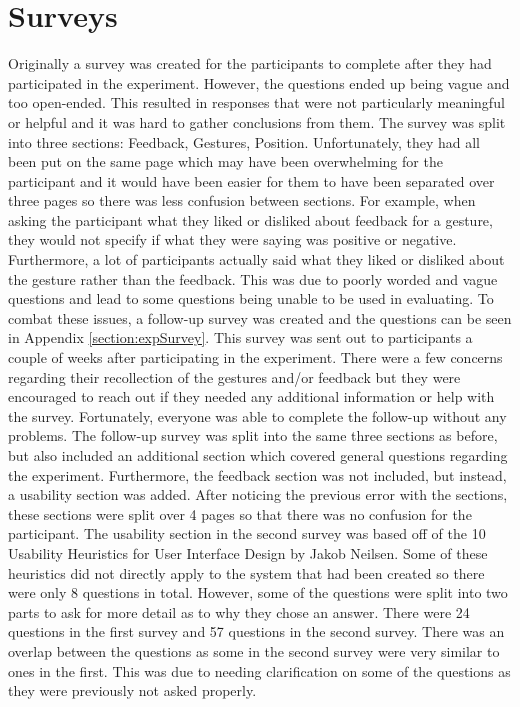 \documentclass{l4proj}
\begin{document}
\section{Surveys}
Originally a survey was created for the participants to complete after they had participated in the experiment. However, the questions ended up being vague and too open-ended. This resulted in responses that were not particularly meaningful or helpful and it was hard to gather conclusions from them. 
The survey was split into three sections: Feedback, Gestures, Position. Unfortunately, they had all been put on the same page which may have been overwhelming for the participant and it would have been easier for them to have been separated over three pages so there was less confusion between sections. 
For example, when asking the participant what they liked or disliked about feedback for a gesture, they would not specify if what they were saying was positive or negative. Furthermore, a lot of participants actually said what they liked or disliked about the gesture rather than the feedback. This was due to poorly worded and vague questions and lead to some questions being unable to be used in evaluating. 
To combat these issues, a follow-up survey was created and the questions can be seen in Appendix \ref{section:expSurvey}. This survey was sent out to participants a couple of weeks after participating in the experiment. There were a few concerns regarding their recollection of the gestures and/or feedback but they were encouraged to reach out if they needed any additional information or help with the survey. Fortunately, everyone was able to complete the follow-up without any problems. 
The follow-up survey was split into the same three sections as before, but also included an additional section which covered general questions regarding the experiment. Furthermore, the feedback section was not included, but instead, a usability section was added. After noticing the previous error with the sections, these sections were split over 4 pages so that there was no confusion for the participant.
The usability section in the second survey was based off of the 10 Usability Heuristics for User Interface Design by Jakob Neilsen. Some of these heuristics did not directly apply to the system that had been created so there were only 8 questions in total. However, some of the questions were split into two parts to ask for more detail as to why they chose an answer. 
There were 24 questions in the first survey and 57 questions in the second survey. There was an overlap between the questions as some in the second survey were very similar to ones in the first. This was due to needing clarification on some of the questions as they were previously not asked properly. 
\end{document}
